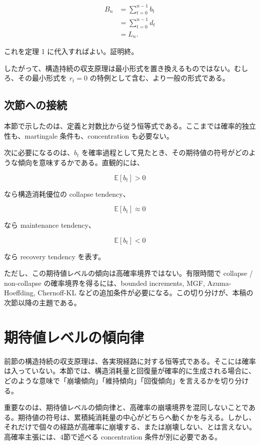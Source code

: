 \documentclass[12pt,a4paper]{article}
\begin{document}
\[
\begin{aligned}
B_{n} &= \sum_{t=0}^{n-1} b_{t} \\
&= \sum_{t=0}^{n-1} d_{t} \\
&= L_{n}.
\end{aligned}
\]

これを定理 1 に代入すればよい。証明終。

したがって、構造持続の収支原理は最小形式を置き換えるものではない。むしろ、その最小形式を \(r_{t}=0\) の特例として含む、より一般の形式である。

\subsection{次節への接続}\label{ux6b21ux7bc0ux3078ux306eux63a5ux7d9a}

本節で示したのは、定義と対数比から従う恒等式である。ここまでは確率的独立性も、martingale 条件も、concentration も必要ない。

次に必要になるのは、\(b_{t}\) を確率過程として見たとき、その期待値の符号がどのような傾向を意味するかである。直観的には、

\[
\mathbb E[b_{t}] > 0
\]

なら構造消耗優位の collapse tendency、

\[
\mathbb E[b_{t}] \approx 0
\]

なら maintenance tendency、

\[
\mathbb E[b_{t}] < 0
\]

なら recovery tendency を表す。

ただし、この期待値レベルの傾向は高確率境界ではない。有限時間で collapse / non-collapse の確率境界を得るには、bounded increments, MGF, Azuma-Hoeffding, Chernoff-KL などの追加条件が必要になる。この切り分けが、本稿の次節以降の主題である。

\section{期待値レベルの傾向律}\label{ux671fux5f85ux5024ux30ecux30d9ux30ebux306eux50beux5411ux5f8b}

前節の構造持続の収支原理は、各実現経路に対する恒等式である。そこには確率は入っていない。本節では、構造消耗量と回復量が確率的に生成される場合に、どのような意味で「崩壊傾向」「維持傾向」「回復傾向」を言えるかを切り分ける。

重要なのは、期待値レベルの傾向律と、高確率の崩壊境界を混同しないことである。期待値の符号は、累積純消耗量の中心がどちらへ動くかを与える。しかし、それだけで個々の経路が高確率に崩壊する、または崩壊しない、とは言えない。高確率主張には、4節で述べる concentration 条件が別に必要である。
\end{document}
